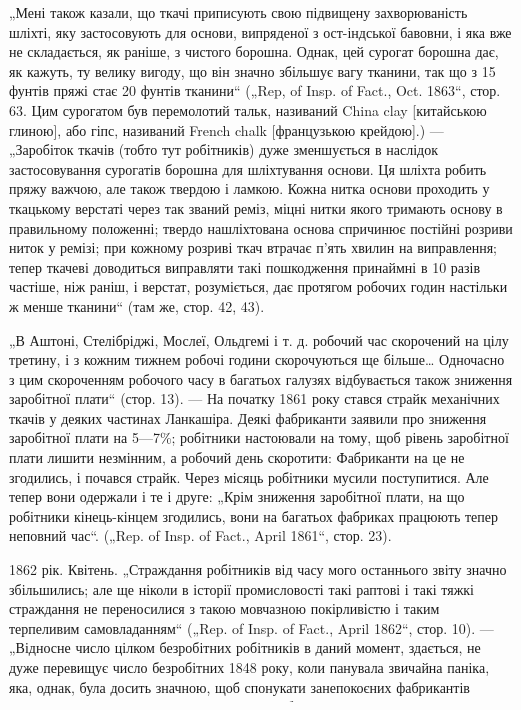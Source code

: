 „Мені також казали, що ткачі приписують свою підвищену
захворюваність шліхті, яку застосовують для основи, випряденої
з ост-індської бавовни, і яка вже не складається, як раніше,
з чистого борошна. Однак, цей сурогат борошна дає, як кажуть,
ту велику вигоду, що він значно збільшує вагу тканини, так
що з 15 фунтів пряжі стає 20 фунтів тканини“ („Rep, of Insp.
of Fact., Oct. 1863“, стор. 63. Цим сурогатом був перемолотий
тальк, називаний China clay [китайською глиною], або гіпс, називаний
French chalk [французькою крейдою].) — „Заробіток ткачів
(тобто тут робітників) дуже зменшується в наслідок застосовування
сурогатів борошна для шліхтування основи. Ця шліхта
робить пряжу важчою, але також твердою і ламкою. Кожна
нитка основи проходить у ткацькому верстаті через так званий
реміз, міцні нитки якого тримають основу в правильному положенні;
твердо нашліхтована основа спричинює постійні розриви
ниток у ремізі; при кожному розриві ткач втрачає п’ять хвилин
на виправлення; тепер ткачеві доводиться виправляти такі
пошкодження принаймні в 10 разів частіше, ніж раніш, і верстат,
розуміється, дає протягом робочих годин настільки ж менше
тканини“ (там же, стор. 42, 43).

„В Аштоні, Стелібріджі, Мослеї, Ольдгемі і т. д. робочий
час скорочений на цілу третину, і з кожним тижнем робочі години
скорочуються ще більше\dots{} Одночасно з цим скороченням
робочого часу в багатьох галузях відбувається також зниження
заробітної плати“ (стор. 13). — На початку 1861 року стався
страйк механічних ткачів у деяких частинах Ланкашіра. Деякі
фабриканти заявили про зниження заробітної плати на 5—7\%;
робітники настоювали на тому, щоб рівень заробітної плати лишити
незмінним, а робочий день скоротити: Фабриканти на це не
згодились, і почався страйк. Через місяць робітники мусили поступитися.
Але тепер вони одержали і те і друге: „Крім зниження
заробітної плати, на що робітники кінець-кінцем згодились,
вони на багатьох фабриках працюють тепер неповний час“.
(„Rep. of Insp. of Fact., April 1861“, стор. 23).

1862 рік. Квітень. „Страждання робітників від часу мого
останнього звіту значно збільшились; але ще ніколи в історії
промисловості такі раптові і такі тяжкі страждання не переносилися
з такою мовчазною покірливістю і таким терпеливим
самовладанням“ („Rep. of Insp. of Fact., April 1862“, стор. 10). —
„Відносне число цілком безробітних робітників в даний момент,
здається, не дуже перевищує число безробітних 1848 року,
коли панувала звичайна паніка, яка, однак, була досить значною,
щоб спонукати занепокоєних фабрикантів складати такі
самі статистичні відомості про бавовняну промисловість, які
тепер публікують щотижня\dots{} В травні 1848 року з усіх бавовняних
робітників Манчестера 15\% було без роботи, 12\% працювало
неповний час, тоді як понад 70\% працювало повний час. 28 травня
1862 року без роботи було 15\%, 35\% працювало неповний час,
49\% — повний час\dots{} В сусідніх місцевостях, наприклад, в Стокпорті,
процент тих, що працюють неповний час, і тих, що зовсім
не працюють, вищий, процент тих, що працюють повний час,
нижчий“, бо тут випрядаються грубіші нумери, ніж у Манчестері
(стор. 16).

